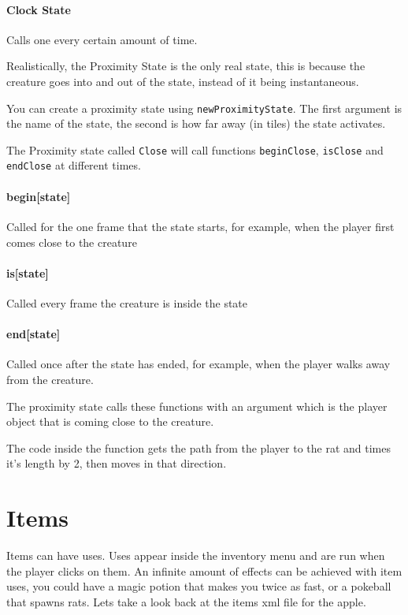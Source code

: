 \documentclass{book}
\begin{document}
\paragraph{Clock State} Calls one every certain amount of time.

Realistically, the Proximity State is the only real state, this is because the creature goes into and out of the state, instead of it being instantaneous.

You can create a proximity state using \texttt{newProximityState}. The first argument is the name of the state, the second is how far away (in tiles) the state activates.

The Proximity state called \texttt{Close} will call functions \texttt{beginClose}, \texttt{isClose} and \texttt{endClose} at different times.

\paragraph{begin[state]} Called for the one frame that the state starts, for example, when the player first comes close to the creature

\paragraph{is[state]} Called every frame the creature is inside the state

\paragraph{end[state]} Called once after the state has ended, for example, when the player walks away from the creature.

The proximity state calls these functions with an argument which is the player object that is coming close to the creature.

The code inside the function gets the path from the player to the rat and times it's length by 2, then moves in that direction.


\section{Items}
Items can have uses. Uses appear inside the inventory menu and are run when the player clicks on them. An infinite amount of effects can be achieved with item uses, you could have a magic potion that makes you twice as fast, or a pokeball that spawns rats. Lets take a look back at the items xml file for the apple.
\end{document}

